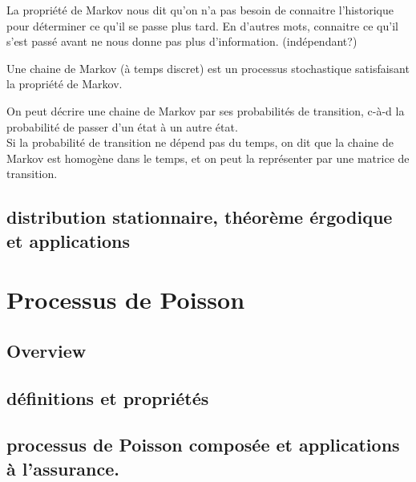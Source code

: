 \documentclass{article}
\begin{document}
\begin{definition}

\end{definition}

\begin{remark}
    La propriété de Markov nous dit qu'on n'a pas besoin de connaitre
    l'historique pour déterminer ce qu'il se passe plus tard. En d'autres
    mots, connaitre ce qu'il s'est passé avant ne nous donne pas plus
    d'information. (indépendant?)
\end{remark}

\begin{definition}
    Une chaine de Markov (à temps discret) est un processus stochastique
    satisfaisant la propriété de Markov.\\
\end{definition}

\begin{defintion}
    On peut décrire une chaine de Markov par ses probabilités de transition,
    c-à-d la probabilité de passer d'un état à un autre état.\\

    Si la probabilité de transition ne dépend pas du temps, on dit que
    la chaine de Markov est homogène dans le temps, et on peut la
    représenter par une matrice de transition.
\end{defintion}

\subsection{distribution stationnaire, théorème érgodique et applications}
\pagebreak

\section{Processus de Poisson}
\subsection{Overview}
\subsection{définitions et propriétés}
\subsection{processus de Poisson composée et applications à l’assurance.}
\pagebreak
\end{document}
